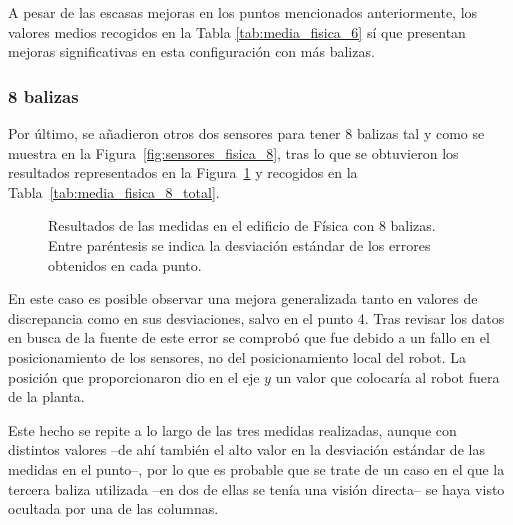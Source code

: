 A pesar de las escasas mejoras en los puntos mencionados anteriormente, los valores medios recogidos en la Tabla \ref{tab:media_fisica_6} sí que presentan mejoras significativas en esta configuración con más balizas.

\subsubsection{8 balizas}

Por último, se añadieron otros dos sensores para tener 8 balizas tal y como se muestra en la Figura~\ref{fig:sensores_fisica_8}, tras lo que se obtuvieron los resultados representados en la Figura~\ref{fig:res_fisica_8} y recogidos en la Tabla~\ref{tab:media_fisica_8_total}.
\begin{figure}[H]
    \centering
    
    \caption{Resultados de las medidas en el edificio de Física con 8 balizas. \newline Entre paréntesis se indica la desviación estándar de los errores obtenidos en cada punto.}
    \label{fig:res_fisica_8}
\end{figure}

En este caso es posible observar una mejora generalizada tanto en valores de discrepancia como en sus desviaciones, salvo en el punto 4.
Tras revisar los datos en busca de la fuente de este error se comprobó que fue debido a un fallo en el posicionamiento de los sensores, no del posicionamiento local del robot.
La posición que proporcionaron dio en el eje $y$ un valor que colocaría al robot fuera de la planta.

Este hecho se repite a lo largo de las tres medidas realizadas, aunque con distintos valores --de ahí también el alto valor en la desviación estándar de las medidas en el punto--, por lo que es probable que se trate de un caso en el que la tercera baliza utilizada --en dos de ellas se tenía una visión directa-- se haya visto ocultada por una de las columnas.

